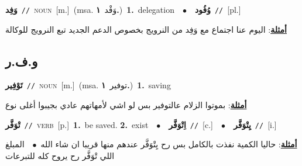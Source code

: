 \documentclass[10pt,a4paper,twoside]{article} %
\begin{document}
\begin{multicols}{2}
{\setlength\topsep{0pt}\textbf{\foreignlanguage{arabic}{وَفِد}}\ {\color{gray}\texttt{//}\color{black}}\ \textsc{noun}\ [m.]\ \color{gray}(msa. \foreignlanguage{arabic}{وَفْد}~\foreignlanguage{arabic}{\textbf{١.}})\color{black}\ \textbf{1.}~delegation\ \ $\bullet$\ \ \setlength\topsep{0pt}\textbf{\foreignlanguage{arabic}{وُفُود}}\ {\color{gray}\texttt{//}\color{black}}\ [pl.]\  \begin{flushright}\color{gray}\foreignlanguage{arabic}{\textbf{\underline{\foreignlanguage{arabic}{أمثلة}}}: اليوم عنا اجتماع مع وَفِد من النرويج بخصوص الدعم الجديد تبع النرويج للوكالة}\end{flushright}\color{black}} \vspace{2mm}

\vspace{-3mm}
\subsection*{\color{blue}\foreignlanguage{arabic}{و.ف.ر}\color{blue}{}} 

{\setlength\topsep{0pt}\textbf{\foreignlanguage{arabic}{تَوْفِير}}\ {\color{gray}\texttt{//}\color{black}}\ \textsc{noun}\ [m.]\ \color{gray}(msa. \foreignlanguage{arabic}{توفير}~\foreignlanguage{arabic}{\textbf{١.}})\color{black}\ \textbf{1.}~saving\  \begin{flushright}\color{gray}\foreignlanguage{arabic}{\textbf{\underline{\foreignlanguage{arabic}{أمثلة}}}: بموتوا الزلام عالتوفير بس لو اشي لأمهاتهم عادي بجيبوا أغلى نوع}\end{flushright}\color{black}} \vspace{2mm}

{\setlength\topsep{0pt}\textbf{\foreignlanguage{arabic}{تْوَفَّر}}\ {\color{gray}\texttt{//}\color{black}}\ \textsc{verb}\ [p.]\ \textbf{1.}~be saved.  \textbf{2.}~exist\ \ $\bullet$\ \ \setlength\topsep{0pt}\textbf{\foreignlanguage{arabic}{اِتْوَفَّر}}\ {\color{gray}\texttt{//}\color{black}}\ [c.]\ \ $\bullet$\ \ \setlength\topsep{0pt}\textbf{\foreignlanguage{arabic}{يِتْوَفَّر}}\ {\color{gray}\texttt{//}\color{black}}\ [i.]\  \begin{flushright}\color{gray}\foreignlanguage{arabic}{\textbf{\underline{\foreignlanguage{arabic}{أمثلة}}}: حاليا الكمية نفذت بالكامل بس رح يِتْوَفَّر عندهم منها قريبا ان شاء الله\ $\bullet$\ \  المبلغ اللي تْوَفَّر رح يروح كله للتبرعات}\end{flushright}\color{black}} \vspace{2mm}


\end{multicols}
\end{document}

